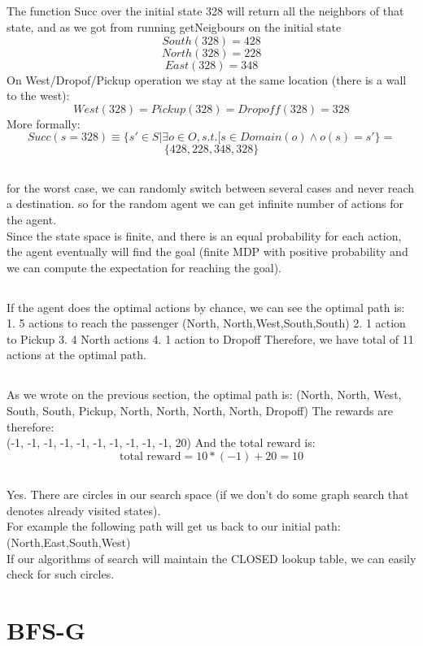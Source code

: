 \documentclass[12pt]{article}
\begin{document}
\subsection{}
The function Succ over the initial state 328 will return all the neighbors of that state, and as we got from running getNeigbours on the initial state\\
$$South(328)=428$$
$$North(328)=228$$
$$East(328)=348$$
On West/Dropof/Pickup operation we stay at the same location (there is a wall to the west):
$$West(328)=Pickup(328)=Dropoff(328)=328$$
More formally:
$$Succ(s=328)\equiv\{s'\in S | \exists o\in O, s.t. [s \in Domain(o)\wedge o(s)=s'\} = $$
$$\{428,228,348,328\}$$
\subsection{}
for the worst case, we can randomly switch between several cases and never reach a destination. so for the random agent we can get infinite number of actions for the agent.\\
Since the state space is finite, and there is an equal probability for each action, the agent eventually will find the goal (finite MDP with positive probability and we can compute the expectation for reaching the goal).
\subsection{}
If the agent does the optimal actions by chance, we can see the optimal path is:
1. 5 actions to reach the passenger (North, North,West,South,South)
2. 1 action to Pickup
3. 4 North actions
4. 1 action to Dropoff
Therefore, we have total of 11 actions at the optimal path.
\subsection{}
As we wrote on the previous section, the optimal path is:
(North, North, West, South, South, Pickup, North, North, North, North, Dropoff)
The rewards are therefore:\\
(-1, -1, -1, -1, -1, -1, -1, -1, -1, -1, 20)
And the total reward is:
$$\text{total reward} = 10*(-1) + 20 = 10$$

\subsection{}
Yes. There are circles in our search space (if we don't do some graph search that denotes already visited states).\\
For example the following path will get us back to our initial path:\\
(North,East,South,West)\\
If our algorithms of search will maintain the CLOSED lookup table, we can easily check for such circles.

\section{BFS-G}

\subsection{}
\end{document}
